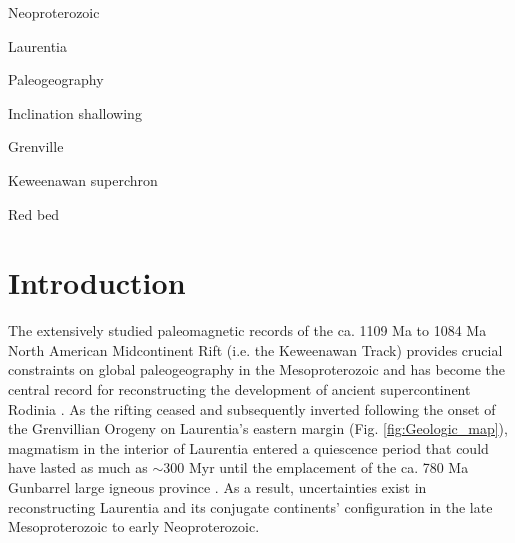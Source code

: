 \documentclass[draft]{agujournal2019}
\begin{document}


\begin{keypoints}
\item Neoproterozoic
\item Laurentia  
\item Paleogeography
\item Inclination shallowing
\item Grenville
\item Keweenawan superchron
\item Red bed
\end{keypoints}

\section*{Introduction}

The extensively studied paleomagnetic records of the ca. 1109 Ma to 1084 Ma North American Midcontinent Rift (i.e. the Keweenawan Track) provides crucial constraints on global paleogeography in the Mesoproterozoic and has become the central record for reconstructing the development of ancient supercontinent Rodinia \cite{Swanson-Hysell2019a, Swanson-Hysell2021c}. As the rifting ceased and subsequently inverted following the onset of the Grenvillian Orogeny on Laurentia's eastern margin (Fig. \ref{fig:Geologic_map}), magmatism in the interior of Laurentia entered a quiescence period that could have lasted as much as $\sim$300 Myr until the emplacement of the ca. 780 Ma Gunbarrel large igneous province \cite{Harlan2003a}. As a result, uncertainties exist in reconstructing Laurentia and its conjugate continents' configuration in the late Mesoproterozoic to early Neoproterozoic. 
\end{document}
